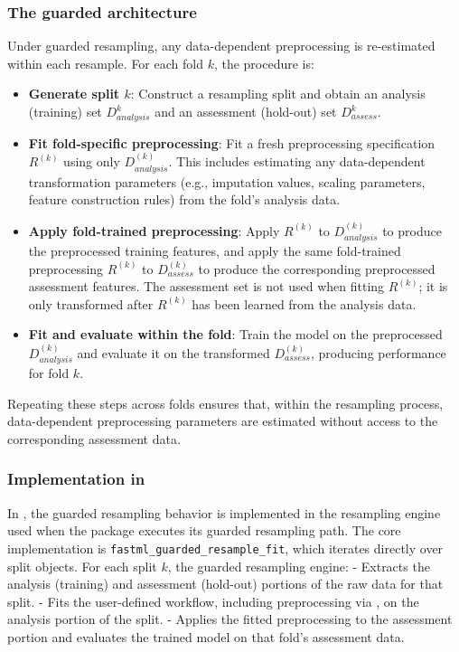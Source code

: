 \subsubsection{The guarded architecture}\label{the-guarded-architecture}

Under guarded resampling, any data-dependent preprocessing is re-estimated within each resample. For each fold \(k\), the procedure is:

\begin{itemize}
\item
  \textbf{Generate split \(k\)}: Construct a resampling split and obtain an analysis (training) set \(D_{analysis}^{k}\) and an assessment (hold-out) set \(D_{assess}^{k}\).
\item
  \textbf{Fit fold-specific preprocessing}: Fit a fresh preprocessing specification \(R^{(k)}\) using only \(D_{analysis}^{(k)}\). This includes estimating any data-dependent transformation parameters (e.g., imputation values, scaling parameters, feature construction rules) from the fold's analysis data.
\item
  \textbf{Apply fold-trained preprocessing}: Apply \(R^{(k)}\) to \(D_{analysis}^{(k)}\) to produce the preprocessed training features, and apply the same fold-trained preprocessing \(R^{(k)}\) to \(D_{assess}^{(k)}\) to produce the corresponding preprocessed assessment features. The assessment set is not used when fitting \(R^{(k)}\); it is only transformed after \(R^{(k)}\) has been learned from the analysis data.
\item
  \textbf{Fit and evaluate within the fold}: Train the model on the preprocessed \(D_{analysis}^{(k)}\) and evaluate it on the transformed \(D_{assess}^{(k)}\), producing performance for fold \(k\).
\end{itemize}

Repeating these steps across folds ensures that, within the resampling process, data-dependent preprocessing parameters are estimated without access to the corresponding assessment data.

\subsubsection{\texorpdfstring{Implementation in }{Implementation in }}\label{implementation-in}

In , the guarded resampling behavior is implemented in the resampling engine used when the package executes its guarded resampling path. The core implementation is \texttt{fastml\_guarded\_resample\_fit}, which iterates directly over  \citep{Frick:2025_rsample_Rpkg} split objects. For each split \(k\), the guarded resampling engine:
- Extracts the analysis (training) and assessment (hold-out) portions of the raw data for that split.
- Fits the user-defined workflow, including preprocessing via  \citep{Kuhn:2025_recipes_Rpkg}, on the analysis portion of the split.
- Applies the fitted preprocessing to the assessment portion and evaluates the trained model on that fold's assessment data.


